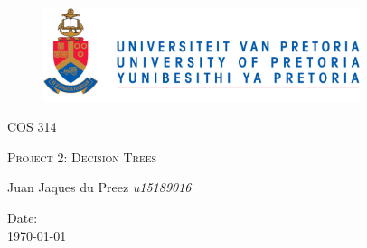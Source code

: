 \begin{titlepage}
	\begin{center}
		\begin{figure}[t]
			\centering
			\includegraphics[width=350px]{logo.PNG}
		\end{figure}
		\begin{center}
			\textsc{\LARGE COS 314}
		\end{center}
		\begin{center}		
			\textsc{\LARGE Project 2: Decision Trees}		
		\end{center}
		
		\begin{flushright} \large
			Juan Jaques du Preez \newline \emph{u15189016} \newline
		\end{flushright}

{\large Date:}
\\
{\large \today}

	\end{center}
\end{titlepage}
